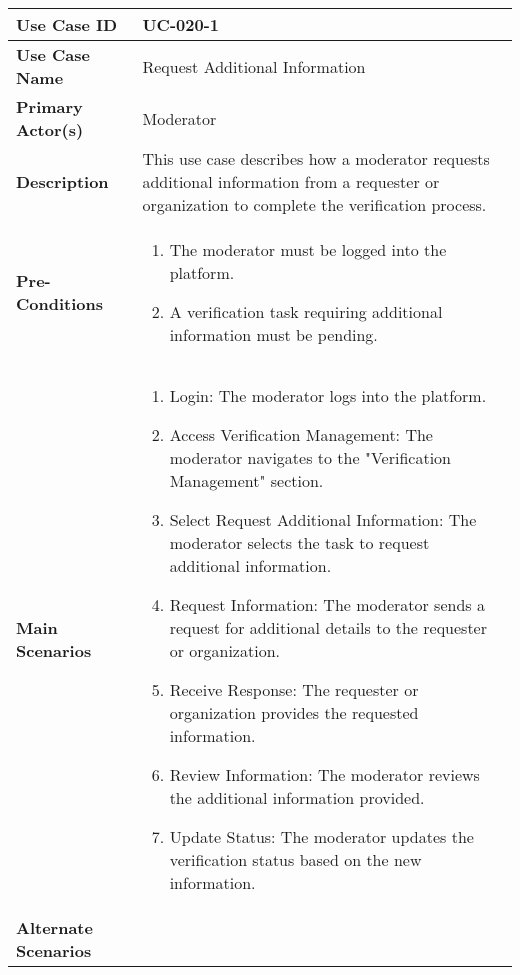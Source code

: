 \begin{table}[!ht]
    \centering
    \renewcommand{\arraystretch}{1.3} %
    \begin{tabularx}{\textwidth}{|l|X|}
        \hline
        \textbf{Use Case ID} & UC-020-1 \\
        \hline
        \textbf{Use Case Name} & Request Additional Information \\
        \hline
        \textbf{Primary Actor(s)} & Moderator \\
        \hline
        \textbf{Description} & This use case describes how a moderator requests additional information from a requester or organization to complete the verification process. \\
        \hline
        \textbf{Pre-Conditions} & 
        \begin{enumerate}[label=\arabic*.,itemsep=0pt]
            \item The moderator must be logged into the platform.
            \item A verification task requiring additional information must be pending.
        \end{enumerate} \\
        \hline
        \textbf{Main Scenarios} & 
        \begin{enumerate}[label=\arabic*.,itemsep=0pt]
            \item Login: The moderator logs into the platform.
            \item Access Verification Management: The moderator navigates to the "Verification Management" section.
            \item Select Request Additional Information: The moderator selects the task to request additional information.
            \item Request Information: The moderator sends a request for additional details to the requester or organization.
            \item Receive Response: The requester or organization provides the requested information.
            \item Review Information: The moderator reviews the additional information provided.
            \item Update Status: The moderator updates the verification status based on the new information.
        \end{enumerate} \\
        \hline
        \textbf{Alternate Scenarios} & 
        \begin{itemize}[label=--,itemsep=0pt]

\end{itemize}
\end{tabularx}
\end{table}
